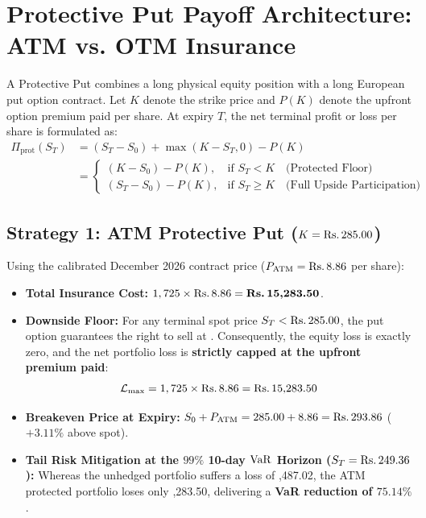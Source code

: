 \section{Protective Put Payoff Architecture: ATM vs. OTM Insurance}
\label{sec:protective_put_mechanics}

A Protective Put combines a long physical equity position with a long European put option contract. Let $K$ denote the strike price and $P(K)$ denote the upfront option premium paid per share. At expiry $T$, the net terminal profit or loss per share is formulated as:
\begin{align}
\Pi_{\text{prot}}(S_T) &= (S_T - S_0) + \max(K - S_T, 0) - P(K) \label{eq:prot_put_pl} \\
&= \begin{cases}
(K - S_0) - P(K), & \text{if } S_T < K \quad \text{(Protected Floor)} \\
(S_T - S_0) - P(K), & \text{if } S_T \ge K \quad \text{(Full Upside Participation)}
\end{cases}
\end{align}

\subsection{Strategy 1: ATM Protective Put ($K = \text{\text{Rs.}\,}285.00$)}

Using the calibrated December 2026 contract price ($P_{\text{ATM}} = \text{\text{Rs.}\,}8.86$ per share):
\begin{itemize}
    \item \textbf{Total Insurance Cost:} $1,725 \times \text{\text{Rs.}\,}8.86 = \text{\textbf{\text{Rs.}\,15,283.50}}$.
    \item \textbf{Downside Floor:} For any terminal spot price $S_T < \text{\text{Rs.}\,}285.00$, the put option guarantees the right to sell at . Consequently, the equity loss is exactly zero, and the net portfolio loss is \textbf{strictly capped at the upfront premium paid}:
    \begin{equation}
    \mathcal{L}_{\max} = 1,725 \times \text{\text{Rs.}\,}8.86 = \text{\text{Rs.}\,15,283.50}
    \end{equation}
    \item \textbf{Breakeven Price at Expiry:} $S_0 + P_{\text{ATM}} = 285.00 + 8.86 = \text{\text{Rs.}\,293.86}$ ($+3.11\%$ above spot).
    \item \textbf{Tail Risk Mitigation at the $99\%$ 10-day $\operatorname{VaR}$ Horizon ($S_T = \text{\text{Rs.}\,}249.36$):} Whereas the unhedged portfolio suffers a loss of ,487.02, the ATM protected portfolio loses only ,283.50, delivering a \textbf{VaR reduction of $75.14\%$}.
\end{itemize}

